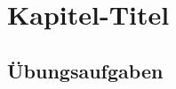 %
%
%
\chapter{Kapitel-Titel
\label{buch:chapter:titel}}
\rhead{}

%

\section*{Übungsaufgaben}
\begin{uebungsaufgaben}
\end{uebungsaufgaben}

